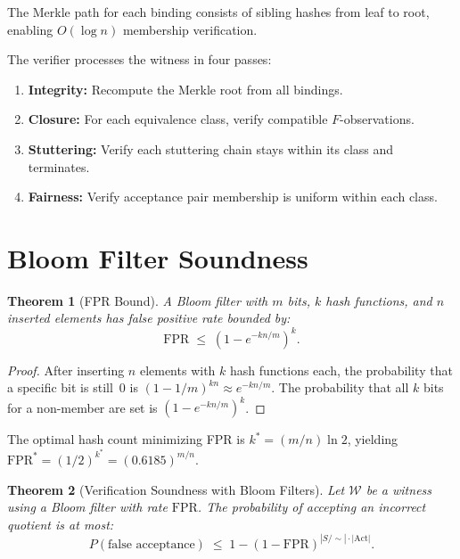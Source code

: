 \documentclass[11pt]{article}
\newtheorem{theorem}{Theorem}
\newcommand{\Act}{\ensuremath{\mathrm{Act}}}
\newcommand{\FPR}{\ensuremath{\mathrm{FPR}}}
\begin{document}
The Merkle path for each binding consists of sibling hashes from leaf to
root, enabling $O(\log n)$ membership verification.

The verifier processes the witness in four passes:
\begin{enumerate}[nosep]
\item \textbf{Integrity:} Recompute the Merkle root from all bindings.
\item \textbf{Closure:} For each equivalence class, verify compatible
  $F$-observations.
\item \textbf{Stuttering:} Verify each stuttering chain stays within its
  class and terminates.
\item \textbf{Fairness:} Verify acceptance pair membership is uniform
  within each class.
\end{enumerate}


\section{Bloom Filter Soundness}
\label{app:bloom}

\begin{theorem}[FPR Bound]
\label{thm:fpr}
A Bloom filter with $m$ bits, $k$ hash functions, and $n$ inserted
elements has false positive rate bounded by:
\begin{equation}\label{eq:fpr}
  \FPR \;\leq\; \left(1 - e^{-kn/m}\right)^k.
\end{equation}
\end{theorem}

\begin{proof}
After inserting $n$ elements with $k$ hash functions each, the
probability that a specific bit is still~0 is
$(1 - 1/m)^{kn} \approx e^{-kn/m}$.
The probability that all $k$ bits for a non-member are set is
$(1 - e^{-kn/m})^k$.
\end{proof}

The optimal hash count minimizing FPR is $k^* = (m/n) \ln 2$, yielding
$\FPR^* = (1/2)^{k^*} = (0.6185)^{m/n}$.

\begin{theorem}[Verification Soundness with Bloom Filters]
\label{thm:bloom-sound}
Let $\mathcal{W}$ be a witness using a Bloom filter with rate $\FPR$.
The probability of accepting an incorrect quotient is at most:
\begin{equation}\label{eq:bloom-sound}
  P(\text{false acceptance}) \;\leq\;
    1 - (1 - \FPR)^{|S/{\sim}| \cdot |\Act|}.
\end{equation}
\end{theorem}
\end{document}
